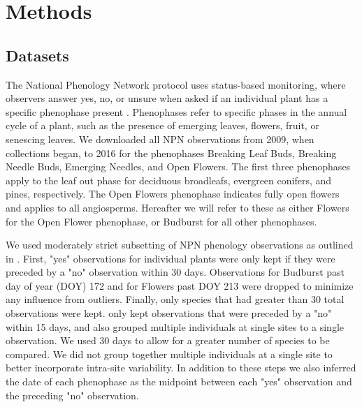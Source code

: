 \documentclass[fleqn,10pt,lineno]{wlpeerj} %
\begin{document}
\section*{Methods}

\subsection*{Datasets}

The National Phenology Network protocol uses status-based monitoring, where observers answer yes, no, or unsure when asked if an individual plant has a specific phenophase present \citep{denny2014}. Phenophases refer to specific phases in the annual cycle of a plant, such as the presence of emerging leaves, flowers, fruit, or senescing leaves. We downloaded all NPN observations from 2009, when collections began, to 2016 for the phenophases Breaking Leaf Buds, Breaking Needle Buds, Emerging Needles, and Open Flowers. The first three phenophases apply to the leaf out phase for deciduous broadleafs, evergreen conifers, and pines, respectively. The Open Flowers phenophase indicates fully open flowers and applies to all angiosperms. Hereafter we will refer to these as either Flowers for the Open Flower phenophase, or Budburst for all other phenophases. 

We used moderately strict subsetting of NPN phenology observations as outlined in \cite{crimmins2017}. First, "yes" observations for individual plants were only kept if they were preceded by a "no" observation within 30 days. Observations for Budburst past day of year (DOY) 172 and for Flowers past DOY 213 were dropped to minimize any influence from outliers. Finally, only species that had greater than 30 total observations were kept. \cite{crimmins2017} only kept observations that were preceded by a "no" within 15 days, and also grouped multiple individuals at single sites to a single observation. We used 30 days to allow for a greater number of species to be compared. We did not group together multiple individuals at a single site to better incorporate intra-site variability. In addition to these steps we also inferred the date of each phenophase as the midpoint between each "yes" observation and the preceding "no" observation. 
\end{document}
